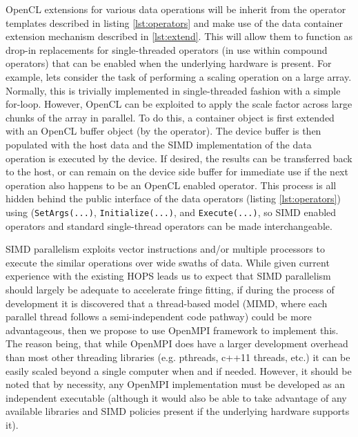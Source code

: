 OpenCL extensions for various data operations will be inherit from the operator templates described in listing \ref{lst:operators} and make use of the data container extension mechanism described in \ref{lst:extend}. This will allow them to function as drop-in replacements for single-threaded operators (in use within compound operators) that can be enabled when the underlying hardware is present. For example, lets consider the task of performing a scaling operation on a large array. Normally, this is trivially implemented in single-threaded fashion with a simple for-loop. However, OpenCL can be exploited to apply the scale factor across large chunks of the array in parallel. To do this, a container object is first extended with an OpenCL buffer object (by the operator). The device buffer is then populated with the host data and the SIMD implementation of the data operation is executed by the device. If desired, the results can be transferred back to the host, or can remain on the device side buffer for immediate use if the next operation also happens to be an OpenCL enabled operator. This process is all hidden behind the public interface of the data operators (listing \ref{lst:operators}) using (\texttt{SetArgs(...)}, \texttt{Initialize(...)}, and \texttt{Execute(...)}, so SIMD enabled operators and standard single-thread operators can be made interchangeable.


SIMD parallelism exploits vector instructions and/or multiple processors to execute the similar operations over wide swaths of data. While given current experience with the existing HOPS leads us to expect that SIMD parallelism should largely be adequate to accelerate fringe fitting, if during the process of development it is discovered that a thread-based model (MIMD, where each parallel thread follows a semi-independent code pathway) could be more advantageous, then we propose to use OpenMPI framework to implement this. The reason being, that while OpenMPI does have a larger development overhead than most other threading libraries (e.g. pthreads, c++11 threads, etc.) it can be easily scaled beyond a single computer when and if needed. However, it should be noted that by necessity, any OpenMPI implementation must be developed as an independent executable (although it would also be able to take advantage of any available libraries and SIMD policies present if the underlying hardware supports it). 
